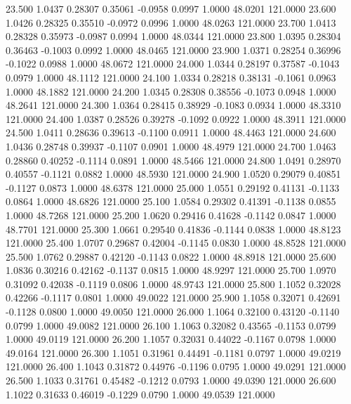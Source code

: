   23.500   1.0437   0.28307   0.35061  -0.0958   0.0997   1.0000  48.0201 121.0000
  23.600   1.0426   0.28325   0.35510  -0.0972   0.0996   1.0000  48.0263 121.0000
  23.700   1.0413   0.28328   0.35973  -0.0987   0.0994   1.0000  48.0344 121.0000
  23.800   1.0395   0.28304   0.36463  -0.1003   0.0992   1.0000  48.0465 121.0000
  23.900   1.0371   0.28254   0.36996  -0.1022   0.0988   1.0000  48.0672 121.0000
  24.000   1.0344   0.28197   0.37587  -0.1043   0.0979   1.0000  48.1112 121.0000
  24.100   1.0334   0.28218   0.38131  -0.1061   0.0963   1.0000  48.1882 121.0000
  24.200   1.0345   0.28308   0.38556  -0.1073   0.0948   1.0000  48.2641 121.0000
  24.300   1.0364   0.28415   0.38929  -0.1083   0.0934   1.0000  48.3310 121.0000
  24.400   1.0387   0.28526   0.39278  -0.1092   0.0922   1.0000  48.3911 121.0000
  24.500   1.0411   0.28636   0.39613  -0.1100   0.0911   1.0000  48.4463 121.0000
  24.600   1.0436   0.28748   0.39937  -0.1107   0.0901   1.0000  48.4979 121.0000
  24.700   1.0463   0.28860   0.40252  -0.1114   0.0891   1.0000  48.5466 121.0000
  24.800   1.0491   0.28970   0.40557  -0.1121   0.0882   1.0000  48.5930 121.0000
  24.900   1.0520   0.29079   0.40851  -0.1127   0.0873   1.0000  48.6378 121.0000
  25.000   1.0551   0.29192   0.41131  -0.1133   0.0864   1.0000  48.6826 121.0000
  25.100   1.0584   0.29302   0.41391  -0.1138   0.0855   1.0000  48.7268 121.0000
  25.200   1.0620   0.29416   0.41628  -0.1142   0.0847   1.0000  48.7701 121.0000
  25.300   1.0661   0.29540   0.41836  -0.1144   0.0838   1.0000  48.8123 121.0000
  25.400   1.0707   0.29687   0.42004  -0.1145   0.0830   1.0000  48.8528 121.0000
  25.500   1.0762   0.29887   0.42120  -0.1143   0.0822   1.0000  48.8918 121.0000
  25.600   1.0836   0.30216   0.42162  -0.1137   0.0815   1.0000  48.9297 121.0000
  25.700   1.0970   0.31092   0.42038  -0.1119   0.0806   1.0000  48.9743 121.0000
  25.800   1.1052   0.32028   0.42266  -0.1117   0.0801   1.0000  49.0022 121.0000
  25.900   1.1058   0.32071   0.42691  -0.1128   0.0800   1.0000  49.0050 121.0000
  26.000   1.1064   0.32100   0.43120  -0.1140   0.0799   1.0000  49.0082 121.0000
  26.100   1.1063   0.32082   0.43565  -0.1153   0.0799   1.0000  49.0119 121.0000
  26.200   1.1057   0.32031   0.44022  -0.1167   0.0798   1.0000  49.0164 121.0000
  26.300   1.1051   0.31961   0.44491  -0.1181   0.0797   1.0000  49.0219 121.0000
  26.400   1.1043   0.31872   0.44976  -0.1196   0.0795   1.0000  49.0291 121.0000
  26.500   1.1033   0.31761   0.45482  -0.1212   0.0793   1.0000  49.0390 121.0000
  26.600   1.1022   0.31633   0.46019  -0.1229   0.0790   1.0000  49.0539 121.0000
